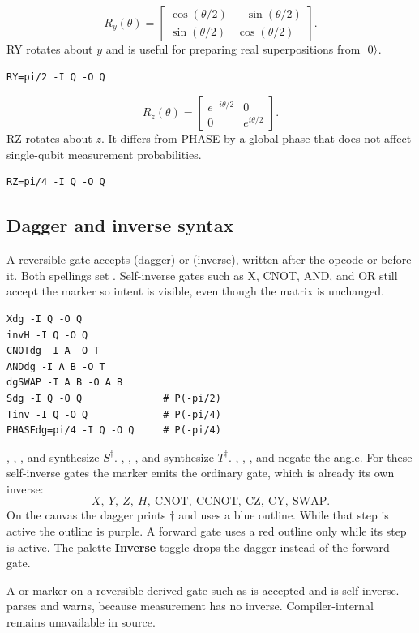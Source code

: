 \[
R_y(\theta)=\begin{bmatrix}
\cos(\theta/2)&-\sin(\theta/2)\\
\sin(\theta/2)&\cos(\theta/2)
\end{bmatrix}.
\]
RY rotates about $y$ and is useful for preparing real superpositions from $\lvert 0\rangle$.
\begin{lstlisting}
RY=pi/2 -I Q -O Q
\end{lstlisting}


\[
R_z(\theta)=\begin{bmatrix}
e^{-i\theta/2}&0\\
0&e^{i\theta/2}
\end{bmatrix}.
\]
RZ rotates about $z$. It differs from PHASE by a global phase that does not
affect single-qubit measurement probabilities.
\begin{lstlisting}
RZ=pi/4 -I Q -O Q
\end{lstlisting}

\subsection{Dagger and inverse syntax}

A reversible gate accepts  (dagger) or  (inverse), written
after the opcode or before it. Both spellings set .
Self-inverse gates such as X, CNOT, AND, and OR still accept the marker so
intent is visible, even though the matrix is unchanged.
\begin{lstlisting}
Xdg -I Q -O Q
invH -I Q -O Q
CNOTdg -I A -O T
ANDdg -I A B -O T
dgSWAP -I A B -O A B
Sdg -I Q -O Q              # P(-pi/2)
Tinv -I Q -O Q             # P(-pi/4)
PHASEdg=pi/4 -I Q -O Q     # P(-pi/4)
\end{lstlisting}
, , , and  synthesize $S^\dagger$.
, , , and  synthesize $T^\dagger$.
, , , and
 negate the angle. For these self-inverse gates the
marker emits the ordinary gate, which is already its own inverse:
\[
X,\ Y,\ Z,\ H,\ \mathrm{CNOT},\ \mathrm{CCNOT},\
\mathrm{CZ},\ \mathrm{CY},\ \mathrm{SWAP}.
\]
On the canvas the dagger prints $\dagger$ and uses a blue outline. While that
step is active the outline is purple. A forward gate uses a red outline only
while its step is active. The palette \textbf{Inverse} toggle drops the dagger
instead of the forward gate.

A  or  marker on a reversible derived gate such as
\code{ANDdg} is accepted and is self-inverse. \code{MEASUREdg} parses and warns,
because measurement has no inverse. Compiler-internal \code{RESET} remains
unavailable in source.

